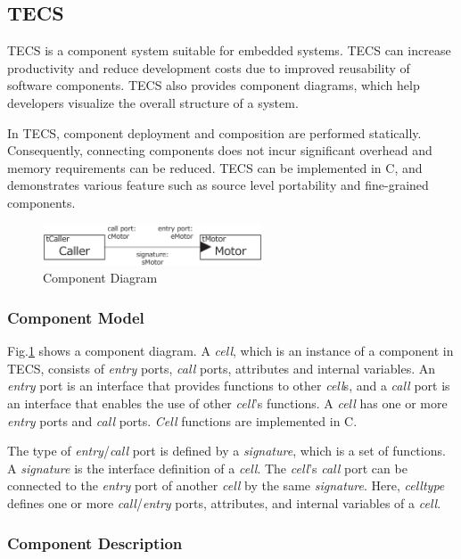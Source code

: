 \documentclass[conference]{IEEEtran/IEEEtran}
\begin{document}
\subsection{TECS}
\label{sec:TECS}

TECS is a component system suitable for embedded systems.
TECS can increase productivity and reduce development costs due to improved reusability of software components.
TECS also provides component diagrams, which help developers visualize the overall structure of a system.

In TECS, component deployment and composition are performed statically.
Consequently, connecting components does not incur significant overhead and memory requirements can be reduced.
TECS can be implemented in C, and demonstrates various feature such as source level portability and fine-grained components.

\begin{figure}[t]
    \centering
    \includegraphics[width=6.5cm,clip]{figure/component_diagram.eps}
    \caption{Component Diagram}
    \label{fig:component}
\end{figure}

\subsubsection{Component Model}

Fig.\ref{fig:component} shows a component diagram.
A {\it cell}, which is an instance of a component in TECS, consists of {\it entry} ports, {\it call} ports, attributes and internal variables.
An {\it entry} port is an interface that provides functions to other {\it cell}s, and a {\it call} port is an interface that enables the use of other {\it cell}'s functions.
A {\it cell} has one or more {\it entry} ports and {\it call} ports.
{\it Cell} functions are implemented in C.

The type of {\it entry}/{\it call} port is defined by a {\it signature}, which is a set of functions.
A {\it signature} is the interface definition of a {\it cell}.
The {\it cell}'s  {\it call} port can be connected to the {\it entry} port of another {\it cell} by the same {\it signature}.
Here, {\it celltype} defines one or more {\it call}/{\it entry} ports, attributes, and internal variables of a {\it cell}.


\subsubsection{Component Description}
\end{document}
